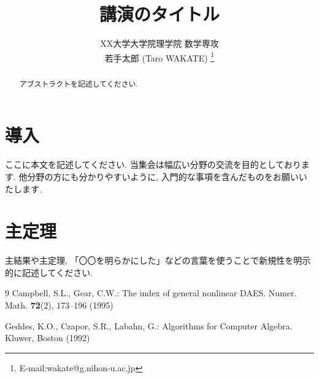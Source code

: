 \documentclass[11pt, a4paper]{jsarticle}
\title{講演のタイトル}    %
\author{XX大学大学院理学院 数学専攻 \\
    若手太郎 (Taro WAKATE) 
    \footnote{E-mail:wakate@g.nihon-u.ac.jp}}
\date{}    %
\begin{document}
\maketitle

\begin{abstract}    %
    アブストラクトを記述してください.
\end{abstract}


\section{導入}
    ここに本文を記述してください.
    当集会は幅広い分野の交流を目的としております.
    他分野の方にも分かりやすいように, 入門的な事項を含んだものをお願いいたします.

\section{主定理}
    主結果や主定理, 「〇〇を明らかにした」などの言葉を使うことで新規性を明示的に記述してください.


\begin{thebibliography}{9}
 Campbell, S.L., Gear, C.W.: 
The index of general nonlinear DAES. Numer. Math. \textbf{72}(2), 173--196 (1995)

 Geddes, K.O., Czapor, S.R., Labahn, G.: 
Algorithms for Computer Algebra. Kluwer, Boston (1992)
\end{thebibliography}
\end{document}
